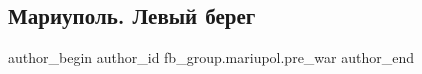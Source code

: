  
 
 
 
 

\subsection{Мариуполь. Левый берег}
\label{sec:09_02_2023.fb.fb_group.mariupol.pre_war.5.mariupol__levii_bere}

\ifcmt
 author_begin
   author_id fb_group.mariupol.pre_war
 author_end
\fi
